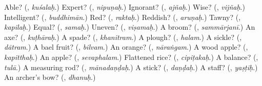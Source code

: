 \begin{tcolorbox}[breakable,colback=teal!4,colframe=teal!35!black,title={Before you move on}]
Able? (\textbf{}, \emph{kuśalaḥ}.) Expert? (\textbf{}, \emph{nipuṇaḥ}.) Ignorant? (\textbf{}, \emph{ajñaḥ}.) Wise? (\textbf{}, \emph{vijñaḥ}.) Intelligent? (\textbf{}, \emph{buddhimān}.) Red? (\textbf{}, \emph{raktaḥ}.) Reddish? (\textbf{}, \emph{aruṇaḥ}.) Tawny? (\textbf{}, \emph{kapilaḥ}.) Equal? (\textbf{}, \emph{samaḥ}.) Uneven? (\textbf{}, \emph{viṣamaḥ}.) A broom? (\textbf{}, \emph{sammārjanī}.) An axe? (\textbf{}, \emph{kuṭhāraḥ}.) A spade? (\textbf{}, \emph{khanitram}.) A plough? (\textbf{}, \emph{halam}.) A sickle? (\textbf{}, \emph{dātram}.) A bael fruit? (\textbf{}, \emph{bilvam}.) An orange? (\textbf{}, \emph{nāraṅgam}.) A wood apple? (\textbf{}, \emph{kapitthaḥ}.) An apple? (\textbf{}, \emph{sevaphalam}.) Flattened rice? (\textbf{}, \emph{cipiṭakaḥ}.) A balance? (\textbf{}, \emph{tulā}.) A measuring rod? (\textbf{}, \emph{mānadaṇḍaḥ}.) A stick? (\textbf{}, \emph{daṇḍaḥ}.) A staff? (\textbf{}, \emph{yaṣṭiḥ}.) An archer's bow? (\textbf{}, \emph{dhanuḥ}.)
\end{tcolorbox}
